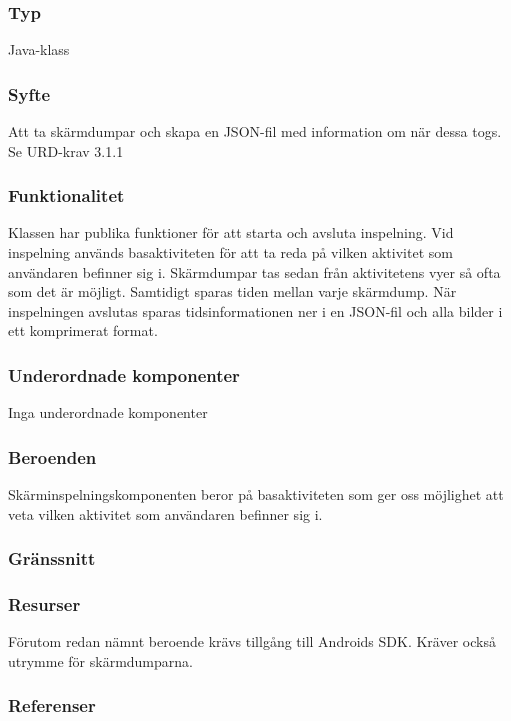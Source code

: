 \subsubsection{Typ}
Java-klass
\subsubsection{Syfte}
Att ta skärmdumpar och skapa en JSON-fil med information om när dessa togs.
Se URD-krav 3.1.1
\subsubsection{Funktionalitet}
Klassen har publika funktioner för att starta och avsluta inspelning. Vid inspelning används basaktiviteten för att ta reda på vilken aktivitet som användaren befinner sig i. Skärmdumpar tas sedan från aktivitetens vyer så ofta som det är möjligt. Samtidigt sparas tiden mellan varje skärmdump. När inspelningen avslutas sparas tidsinformationen ner i en JSON-fil och alla bilder i ett komprimerat format. 

\subsubsection{Underordnade komponenter}
Inga underordnade komponenter
\subsubsection{Beroenden}
Skärminspelningskomponenten beror på basaktiviteten som ger oss möjlighet att veta vilken aktivitet som användaren befinner sig i.
\subsubsection{Gränssnitt}

\subsubsection{Resurser}
Förutom redan nämnt beroende krävs tillgång till Androids SDK. Kräver också utrymme för skärmdumparna.
\subsubsection{Referenser}

